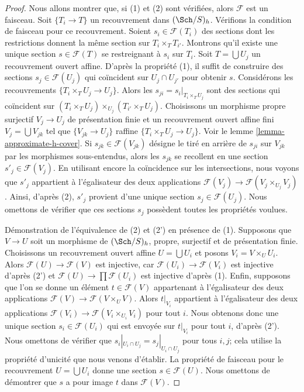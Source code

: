\begin{proof}
Nous allons montrer que, si (1) et (2) sont vérifiées, alors $\mathcal{F}$ est un faisceau.
Soit $\{T_i \to T\}$ un recouvrement dans $(\Sch/S)_h$.
Vérifions la condition de faisceau pour ce recouvrement.
Soient $s_i \in \mathcal{F}(T_i)$ des sections dont les restrictions donnent la même
section sur $T_i \times_T T_{i'}$. Montrons qu'il existe une
unique section $s \in \mathcal{F}(T)$ se restreignant à $s_i$ sur $T_i$.
Soit $T = \bigcup U_j$ un recouvrement ouvert affine.
D'après la propriété (1), il suffit de construire des sections $s_j \in \mathcal{F}(U_j)$
qui coïncident sur $U_j \cap U_{j'}$ pour obtenir $s$.
Considérons les recouvrements $\{T_i \times_T U_j \to U_j\}$.
Alors les $s_{ji} = s_i|_{T_i \times_T U_j}$ sont des sections qui coïncident
sur $(T_i \times_T U_j) \times_{U_j} (T_{i'} \times_T U_j)$.
Choisissons un morphisme propre surjectif $V_j \to U_j$ de présentation finie
et un recouvrement ouvert affine fini $V_j = \bigcup V_{jk}$
tel que $\{V_{jk} \to U_j\}$ raffine $\{T_i \times_T U_j \to U_j\}$.
Voir le lemme \ref{lemma-approximate-h-cover}.
Si $s_{jk} \in \mathcal{F}(V_{jk})$
désigne le tiré en arrière de $s_{ji}$ sur $V_{jk}$ par les
morphismes sous-entendus, alors les $s_{jk}$ se recollent en une section
$s'_j \in \mathcal{F}(V_j)$. En utilisant encore la coïncidence sur les intersections,
nous voyons que $s'_j$ appartient à l'égalisateur des deux
applications $\mathcal{F}(V_j) \to \mathcal{F}(V_j \times_{U_j} V_j)$.
Ainsi, d'après (2), $s'_j$ provient d'une unique section
$s_j \in \mathcal{F}(U_j)$. Nous omettons de vérifier que ces
sections $s_j$ possèdent toutes les propriétés voulues.

\medskip\noindent
Démonstration de l'équivalence de (2) et (2') en présence de (1).
Supposons que $V \to U$ soit un morphisme de $(\Sch/S)_h$,
propre, surjectif et de présentation finie. Choisissons un
recouvrement ouvert affine $U = \bigcup U_i$ et posons $V_i = V \times_U U_i$.
Alors $\mathcal{F}(U) \to \mathcal{F}(V)$
est injective, car $\mathcal{F}(U_i) \to \mathcal{F}(V_i)$
est injective d'après (2') et $\mathcal{F}(U) \to \prod \mathcal{F}(U_i)$
est injective d'après (1). Enfin, supposons que l'on se donne un élément
$t \in \mathcal{F}(V)$ appartenant à l'égalisateur des deux applications
$\mathcal{F}(V) \to \mathcal{F}(V \times_U V)$.
Alors $t|_{V_i}$ appartient à l'égalisateur des deux applications
$\mathcal{F}(V_i) \to \mathcal{F}(V_i \times_{U_i} V_i)$
pour tout $i$. Nous obtenons donc une unique section $s_i \in \mathcal{F}(U_i)$
qui est envoyée sur $t|_{V_i}$ pour tout $i$, d'après (2').
Nous omettons de vérifier que $s_i|_{U_i \cap U_j} = s_j|_{U_i \cap U_j}$
pour tous $i, j$; cela utilise la propriété d'unicité que nous venons d'établir.
La propriété de faisceau pour le recouvrement $U = \bigcup U_i$ donne
une section $s \in \mathcal{F}(U)$. Nous omettons de démontrer que $s$
a pour image $t$ dans $\mathcal{F}(V)$.
\end{proof}

